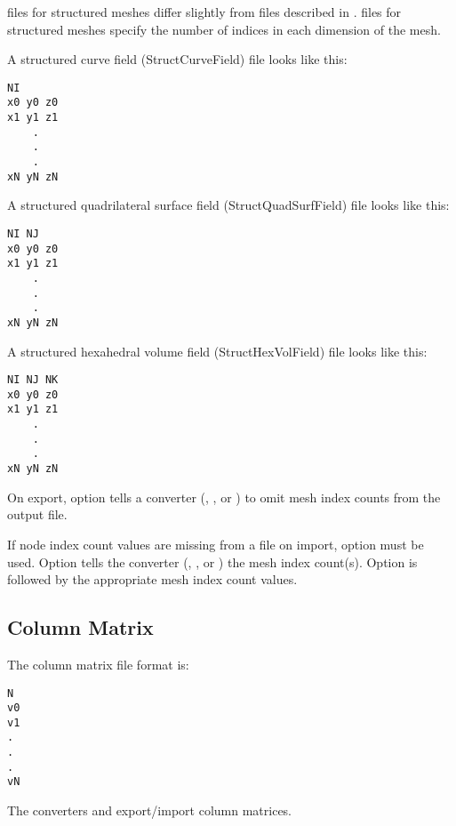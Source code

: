  files for structured meshes differ slightly
from  files described in .   files for
structured meshes specify the number of indices in each dimension of the
mesh. 

A structured curve field (StructCurveField)  file looks
like this:

\begin{verbatim}
NI
x0 y0 z0
x1 y1 z1
    .
    .
    .
xN yN zN
\end{verbatim}

A structured quadrilateral surface field
(StructQuadSurfField)  file looks like this:

\begin{verbatim}
NI NJ
x0 y0 z0
x1 y1 z1
    .
    .
    .
xN yN zN
\end{verbatim}

A structured hexahedral volume field (StructHexVolField)
 file looks like this:

\begin{verbatim}
NI NJ NK
x0 y0 z0
x1 y1 z1
    .
    .
    .
xN yN zN
\end{verbatim}

On export, option  tells a converter
(, , or
) to omit mesh index counts
from the output file.

If node index count values are missing from a file on import, option
 must be used.  Option  tells the
converter (,
, or
) the mesh index count(s).  Option
 is followed by the appropriate mesh index count
values.

\subsection{Column Matrix}
\label{sec:colmat}

The column matrix file format is:

\begin{verbatim}
N
v0 
v1
.
.
.
vN
\end{verbatim}

The converters  and  
export/import column matrices.


